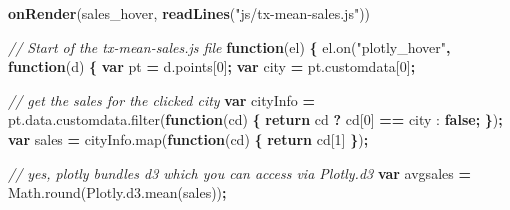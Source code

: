 \documentclass[
  12pt,
]{krantz}
\newenvironment{Shaded}{\begin{snugshade}}{\end{snugshade}}
\newcommand{\AttributeTok}[1]{\textcolor[rgb]{0.77,0.63,0.00}{#1}}
\newcommand{\CommentTok}[1]{\textcolor[rgb]{0.56,0.35,0.01}{\textit{#1}}}
\newcommand{\ControlFlowTok}[1]{\textcolor[rgb]{0.13,0.29,0.53}{\textbf{#1}}}
\newcommand{\DecValTok}[1]{\textcolor[rgb]{0.00,0.00,0.81}{#1}}
\newcommand{\KeywordTok}[1]{\textcolor[rgb]{0.13,0.29,0.53}{\textbf{#1}}}
\newcommand{\NormalTok}[1]{#1}
\newcommand{\OperatorTok}[1]{\textcolor[rgb]{0.81,0.36,0.00}{\textbf{#1}}}
\newcommand{\StringTok}[1]{\textcolor[rgb]{0.31,0.60,0.02}{#1}}
\newcommand{\VariableTok}[1]{\textcolor[rgb]{0.00,0.00,0.00}{#1}}
\begin{document}

\begin{Shaded}
\begin{Highlighting}[]
\KeywordTok{onRender}\NormalTok{(sales_hover, }\KeywordTok{readLines}\NormalTok{(}\StringTok{"js/tx-mean-sales.js"}\NormalTok{))}
\end{Highlighting}
\end{Shaded}

\begin{Shaded}
\begin{Highlighting}[]
\CommentTok{// Start of the tx-mean-sales.js file}
\KeywordTok{function}\NormalTok{(el) }\OperatorTok{\{}
  \VariableTok{el}\NormalTok{.}\AttributeTok{on}\NormalTok{(}\StringTok{"plotly_hover"}\OperatorTok{,} \KeywordTok{function}\NormalTok{(d) }\OperatorTok{\{}
    \KeywordTok{var}\NormalTok{ pt }\OperatorTok{=} \VariableTok{d}\NormalTok{.}\AttributeTok{points}\NormalTok{[}\DecValTok{0}\NormalTok{]}\OperatorTok{;}
    \KeywordTok{var}\NormalTok{ city }\OperatorTok{=} \VariableTok{pt}\NormalTok{.}\AttributeTok{customdata}\NormalTok{[}\DecValTok{0}\NormalTok{]}\OperatorTok{;}

    \CommentTok{// get the sales for the clicked city}
    \KeywordTok{var}\NormalTok{ cityInfo }\OperatorTok{=} \VariableTok{pt}\NormalTok{.}\VariableTok{data}\NormalTok{.}\VariableTok{customdata}\NormalTok{.}\AttributeTok{filter}\NormalTok{(}\KeywordTok{function}\NormalTok{(cd) }\OperatorTok{\{}
      \ControlFlowTok{return}\NormalTok{ cd }\OperatorTok{?}\NormalTok{ cd[}\DecValTok{0}\NormalTok{] }\OperatorTok{==}\NormalTok{ city : }\KeywordTok{false}\OperatorTok{;}
    \OperatorTok{\}}\NormalTok{)}\OperatorTok{;}
    \KeywordTok{var}\NormalTok{ sales }\OperatorTok{=} \VariableTok{cityInfo}\NormalTok{.}\AttributeTok{map}\NormalTok{(}\KeywordTok{function}\NormalTok{(cd) }\OperatorTok{\{} \ControlFlowTok{return}\NormalTok{ cd[}\DecValTok{1}\NormalTok{] }\OperatorTok{\}}\NormalTok{)}\OperatorTok{;}

    \CommentTok{// yes, plotly bundles d3 which you can access via Plotly.d3}
    \KeywordTok{var}\NormalTok{ avgsales }\OperatorTok{=} \VariableTok{Math}\NormalTok{.}\AttributeTok{round}\NormalTok{(}\VariableTok{Plotly}\NormalTok{.}\VariableTok{d3}\NormalTok{.}\AttributeTok{mean}\NormalTok{(sales))}\OperatorTok{;}


\end{Highlighting}
\end{Shaded}
\end{document}
